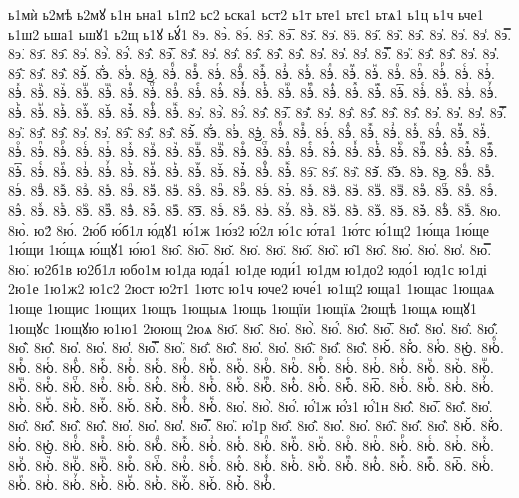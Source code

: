 {ь1мѝ
ь2мѣ
ь2мꙋ
ь1н
ьна1
ь1п2
ьс2
ьска1
ьст2
ь1т
ьте1
ьтє1
ьтѧ1
ь1ц
ь1ч
ьче1
ь1ш2
ьша1
ьшꙋ1
ь2щ
ь1ꙋ
ьꙋ́1
8э.
8э̀.
8э́.
8э̂.
8э̅.
8э̆.
8э̇.
8ӭ.
8э̋.
8э̏.
8э̑.
8э̓.
8э̔.
8э̾.
8э̿.
8э͘.
8э҃.
8э҄.
8э҅.
8э҅̀.
8э҅́.
8э҅̂.
8э҅̅.
8э҅̆.
8э҅̇.
8э҅̈.
8э҅̋.
8э҅̏.
8э҅̑.
8э҅̓.
8э҅̔.
8э҅̾.
8э҅̿.
8э҅͘.
8э҅҃.
8э҅҄.
8э҅҅.
8э҅҆.
8э҅҇.
8э҅᷀.
8э҅᷁.
8э҅᷶.
8э᷷҅.
8э᷸҅.
8э᷹҅.
8э҅ⷠ.
8э҅ⷡ.
8э҅ⷢ.
8э҅ⷣ.
8э҅ⷤ.
8э҅ⷥ.
8э҅ⷦ.
8э҅ⷧ.
8э҅ⷨ.
8э҅ⷩ.
8э҅ⷪ.
8э҅ⷫ.
8э҅ⷬ.
8э҅ⷭ.
8э҅ⷮ.
8э҅ⷯ.
8э҅ⷰ.
8э҅ⷱ.
8э҅ⷲ.
8э҅ⷳ.
8э҅ⷴ.
8э҅ⷵ.
8э҅ⷶ.
8э҅ⷷ.
8э҅ⷸ.
8э҅ⷹ.
8э҅ⷺ.
8э҅ⷻ.
8э҅ⷼ.
8э҅ⷽ.
8э҅ⷾ.
8э҅ⷿ.
8э҅꙯.
8э҅ꙴ.
8э҅ꙵ.
8э҅ꙶ.
8э҅ꙷ.
8э҅ꙸ.
8э҅ꙹ.
8э҅ꙺ.
8э҅ꙻ.
8э҅꙼.
8э҅꙽.
8э҅ꚞ.
8э҅ꚟ.
8э҆.
8э҆̀.
8э҆́.
8э҆̂.
8э҆̅.
8э҆̆.
8э҆̇.
8э҆̈.
8э҆̋.
8э҆̏.
8э҆̑.
8э҆̓.
8э҆̔.
8э҆̾.
8э҆̿.
8э҆͘.
8э҆҃.
8э҆҄.
8э҆҅.
8э҆҆.
8э҆҇.
8э҆᷀.
8э҆᷁.
8э҆᷶.
8э᷷҆.
8э᷸҆.
8э᷹҆.
8э҆ⷠ.
8э҆ⷡ.
8э҆ⷢ.
8э҆ⷣ.
8э҆ⷤ.
8э҆ⷥ.
8э҆ⷦ.
8э҆ⷧ.
8э҆ⷨ.
8э҆ⷩ.
8э҆ⷪ.
8э҆ⷫ.
8э҆ⷬ.
8э҆ⷭ.
8э҆ⷮ.
8э҆ⷯ.
8э҆ⷰ.
8э҆ⷱ.
8э҆ⷲ.
8э҆ⷳ.
8э҆ⷴ.
8э҆ⷵ.
8э҆ⷶ.
8э҆ⷷ.
8э҆ⷸ.
8э҆ⷹ.
8э҆ⷺ.
8э҆ⷻ.
8э҆ⷼ.
8э҆ⷽ.
8э҆ⷾ.
8э҆ⷿ.
8э҆꙯.
8э҆ꙴ.
8э҆ꙵ.
8э҆ꙶ.
8э҆ꙷ.
8э҆ꙸ.
8э҆ꙹ.
8э҆ꙺ.
8э҆ꙻ.
8э҆꙼.
8э҆꙽.
8э҆ꚞ.
8э҆ꚟ.
8э҇.
8э᷀.
8э᷁.
8э᷶.
8э᷷.
8э᷸.
8э᷹.
8эⷠ.
8эⷡ.
8эⷢ.
8эⷣ.
8эⷤ.
8эⷥ.
8эⷦ.
8эⷧ.
8эⷨ.
8эⷩ.
8эⷪ.
8эⷫ.
8эⷬ.
8эⷭ.
8эⷮ.
8эⷯ.
8эⷰ.
8эⷱ.
8эⷲ.
8эⷳ.
8эⷴ.
8эⷵ.
8эⷶ.
8эⷷ.
8эⷸ.
8эⷹ.
8эⷺ.
8эⷻ.
8эⷼ.
8эⷽ.
8эⷾ.
8эⷿ.
8э꙯.
8эꙴ.
8эꙵ.
8эꙶ.
8эꙷ.
8эꙸ.
8эꙹ.
8эꙺ.
8эꙻ.
8э꙼.
8э꙽.
8эꚞ.
8эꚟ.
8ю.
8ю̀.
ю2́
8ю́.
2ю́б
ю́б1л
ю́дꙋ1
ю́1ж
1ю́з2
ю́2л
ю́1с
ю́та1
1ю́тс
ю́1щ2
1ю́ща
1ю́ще
1ю́щи
1ю́щѧ
ю́щꙋ1
ю́ю1
8ю̂.
8ю̅.
8ю̆.
8ю̇.
8ю̈.
8ю̋.
8ю̏.
ю̑1
8ю̑.
8ю̓.
8ю̔.
8ю̾.
8ю̿.
8ю͘.
ю2б1в
ю2б1л
юбо1м
ю1да
юда́1
ю1де
юди́1
ю1дм
ю1до2
юдо́1
юд1с
ю1ді
2ю1е
1ю1ж2
ю1с2
2юст
ю2т1
1ютс
ю1ч
юче2
юче́1
ю1щ2
юща1
1ющас
1ющаѧ
1юще
1ющис
1ющих
1ющъ
1ющыѧ
1ющь
1ющїи
1ющїѧ
2ющѣ
1ющѧ
ющꙋ1
1ющꙋс
1ющꙋю
ю1ю1
2юющ
2юѧ
8ю҃.
8ю҄.
8ю҅.
8ю҅̀.
8ю҅́.
8ю҅̂.
8ю҅̅.
8ю҅̆.
8ю҅̇.
8ю҅̈.
8ю҅̋.
8ю҅̏.
8ю҅̑.
8ю҅̓.
8ю҅̔.
8ю҅̾.
8ю҅̿.
8ю҅͘.
8ю҅҃.
8ю҅҄.
8ю҅҅.
8ю҅҆.
8ю҅҇.
8ю҅᷀.
8ю҅᷁.
8ю҅᷶.
8ю᷷҅.
8ю᷸҅.
8ю᷹҅.
8ю҅ⷠ.
8ю҅ⷡ.
8ю҅ⷢ.
8ю҅ⷣ.
8ю҅ⷤ.
8ю҅ⷥ.
8ю҅ⷦ.
8ю҅ⷧ.
8ю҅ⷨ.
8ю҅ⷩ.
8ю҅ⷪ.
8ю҅ⷫ.
8ю҅ⷬ.
8ю҅ⷭ.
8ю҅ⷮ.
8ю҅ⷯ.
8ю҅ⷰ.
8ю҅ⷱ.
8ю҅ⷲ.
8ю҅ⷳ.
8ю҅ⷴ.
8ю҅ⷵ.
8ю҅ⷶ.
8ю҅ⷷ.
8ю҅ⷸ.
8ю҅ⷹ.
8ю҅ⷺ.
8ю҅ⷻ.
8ю҅ⷼ.
8ю҅ⷽ.
8ю҅ⷾ.
8ю҅ⷿ.
8ю҅꙯.
8ю҅ꙴ.
8ю҅ꙵ.
8ю҅ꙶ.
8ю҅ꙷ.
8ю҅ꙸ.
8ю҅ꙹ.
8ю҅ꙺ.
8ю҅ꙻ.
8ю҅꙼.
8ю҅꙽.
8ю҅ꚞ.
8ю҅ꚟ.
8ю҆.
8ю҆̀.
8ю҆́.
ю҆́1ж
ю҆́з1
ю҆́1н
8ю҆̂.
8ю҆̅.
8ю҆̆.
8ю҆̇.
8ю҆̈.
8ю҆̋.
8ю҆̏.
8ю҆̑.
8ю҆̓.
8ю҆̔.
8ю҆̾.
8ю҆̿.
8ю҆͘.
ю҆1р
8ю҆҃.
8ю҆҄.
8ю҆҅.
8ю҆҆.
8ю҆҇.
8ю҆᷀.
8ю҆᷁.
8ю҆᷶.
8ю᷷҆.
8ю᷸҆.
8ю᷹҆.
8ю҆ⷠ.
8ю҆ⷡ.
8ю҆ⷢ.
8ю҆ⷣ.
8ю҆ⷤ.
8ю҆ⷥ.
8ю҆ⷦ.
8ю҆ⷧ.
8ю҆ⷨ.
8ю҆ⷩ.
8ю҆ⷪ.
8ю҆ⷫ.
8ю҆ⷬ.
8ю҆ⷭ.
8ю҆ⷮ.
8ю҆ⷯ.
8ю҆ⷰ.
8ю҆ⷱ.
8ю҆ⷲ.
8ю҆ⷳ.
8ю҆ⷴ.
8ю҆ⷵ.
8ю҆ⷶ.
8ю҆ⷷ.
8ю҆ⷸ.
8ю҆ⷹ.
8ю҆ⷺ.
8ю҆ⷻ.
8ю҆ⷼ.
8ю҆ⷽ.
8ю҆ⷾ.
8ю҆ⷿ.
8ю҆꙯.
8ю҆ꙴ.
8ю҆ꙵ.
8ю҆ꙶ.
8ю҆ꙷ.
8ю҆ꙸ.
8ю҆ꙹ.
8ю҆ꙺ.
8ю҆ꙻ.
8ю҆꙼.
8ю҆꙽.
8ю҆ꚞ.
}
